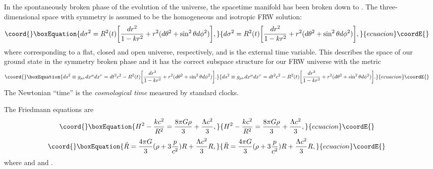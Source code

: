 \documentclass[a4paper,12pt]{article}
\begin{document}
In the spontaneously broken phase of the evolution of the universe, the
spacetime manifold has been broken down to \coordHE{}. The
three-dimensional space with \coordHE{} symmetry is assumed to be the
homogeneous and isotropic FRW solution:
\begin{equation}\coord{}\boxEquation{
d\sigma^2=R^2(t)\biggl[\frac{dr^2}{1-kr^2}+r^2(d\theta^2+\sin^2\theta
d\phi^2)\biggr],
}{
d\sigma^2=R^2(t)\biggl[\frac{dr^2}{1-kr^2}+r^2(d\theta^2+\sin^2\theta
d\phi^2)\biggr],
}{ecuacion}\coordE{}\end{equation}
where \coordHE{} corresponding to a flat, closed and open universe,
respectively, and \coordHE{} is the external time variable. This describes the
space of our ground state in the symmetry broken phase and it has
the correct subspace structure for our FRW universe with the metric
\begin{equation}\coord{}\boxEquation{
\label{metric}
ds^2\equiv
g_{\mu\nu}dx^\mu
dx^\nu=dt^2c^2-R^2(t)\biggl[\frac{dr^2}{1-kr^2}+r^2(d\theta^2+\sin^2\theta
d\phi^2)\biggr].
}{
ds^2\equiv
g_{\mu\nu}dx^\mu
dx^\nu=dt^2c^2-R^2(t)\biggl[\frac{dr^2}{1-kr^2}+r^2(d\theta^2+\sin^2\theta
d\phi^2)\biggr].
}{ecuacion}\coordE{}\end{equation}
The Newtonian ``time'' \coordHE{} is the {\it cosmological time} measured by
standard clocks.

The Friedmann equations are
\begin{equation}\coord{}\boxEquation{
H^2-\frac{kc^2}{R^2}=\frac{8\pi G\rho}{3}+\frac{\Lambda c^2}{3},
}{
H^2-\frac{kc^2}{R^2}=\frac{8\pi G\rho}{3}+\frac{\Lambda c^2}{3},
}{ecuacion}\coordE{}\end{equation}
\begin{equation}\coord{}\boxEquation{
{\ddot R}=\frac{4\pi G}{3}(\rho+3\frac{p}{c^2})R+\frac{\Lambda c^2}{3}R,
}{
{\ddot R}=\frac{4\pi G}{3}(\rho+3\frac{p}{c^2})R+\frac{\Lambda c^2}{3}R,
}{ecuacion}\coordE{}\end{equation}
where \coordHE{} and \coordHE{} and \coordHE{}.
\end{document}
